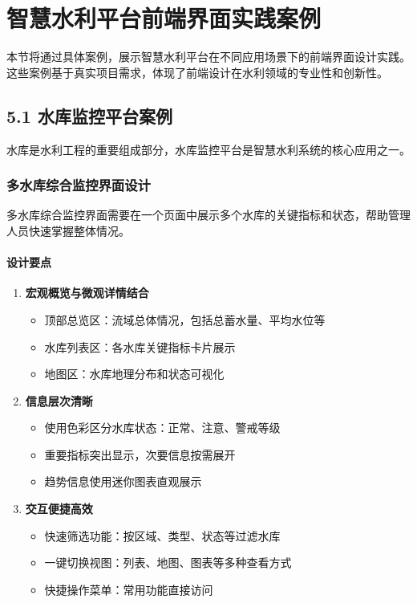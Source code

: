 \section{智慧水利平台前端界面实践案例}\label{ux667aux6167ux6c34ux5229ux5e73ux53f0ux524dux7aefux754cux9762ux5b9eux8df5ux6848ux4f8b}

本节将通过具体案例，展示智慧水利平台在不同应用场景下的前端界面设计实践。这些案例基于真实项目需求，体现了前端设计在水利领域的专业性和创新性。

\subsection{5.1
水库监控平台案例}\label{ux6c34ux5e93ux76d1ux63a7ux5e73ux53f0ux6848ux4f8b}

水库是水利工程的重要组成部分，水库监控平台是智慧水利系统的核心应用之一。

\subsubsection{多水库综合监控界面设计}\label{ux591aux6c34ux5e93ux7efcux5408ux76d1ux63a7ux754cux9762ux8bbeux8ba1}

多水库综合监控界面需要在一个页面中展示多个水库的关键指标和状态，帮助管理人员快速掌握整体情况。

\paragraph{设计要点}\label{ux8bbeux8ba1ux8981ux70b9}

\begin{enumerate}
\def\labelenumi{\arabic{enumi}.}
\tightlist
\item
  \textbf{宏观概览与微观详情结合}

  \begin{itemize}
  \tightlist
  \item
    顶部总览区：流域总体情况，包括总蓄水量、平均水位等
  \item
    水库列表区：各水库关键指标卡片展示
  \item
    地图区：水库地理分布和状态可视化
  \end{itemize}
\item
  \textbf{信息层次清晰}

  \begin{itemize}
  \tightlist
  \item
    使用色彩区分水库状态：正常、注意、警戒等级
  \item
    重要指标突出显示，次要信息按需展开
  \item
    趋势信息使用迷你图表直观展示
  \end{itemize}
\item
  \textbf{交互便捷高效}

  \begin{itemize}
  \tightlist
  \item
    快速筛选功能：按区域、类型、状态等过滤水库
  \item
    一键切换视图：列表、地图、图表等多种查看方式
  \item
    快捷操作菜单：常用功能直接访问
  \end{itemize}
\end{enumerate}

